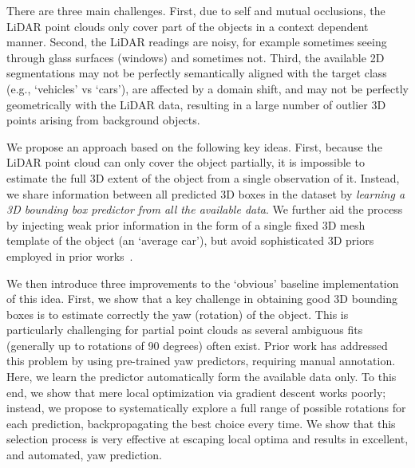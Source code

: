 
There are three main challenges.
First, due to self and mutual occlusions, the LiDAR point clouds only cover part of the objects in a context dependent manner.
Second, the LiDAR readings are noisy, for example sometimes seeing through glass surfaces (windows) and sometimes not.
Third, the available 2D segmentations may not be perfectly semantically aligned with the target class (e.g., `vehicles' vs `cars'), are affected by a domain shift, and may not be perfectly geometrically with the LiDAR data, resulting in a large number of outlier 3D points arising from background objects.

We propose an approach based on the following key ideas.
First, because the LiDAR point cloud can only cover the object partially, it is impossible to estimate the full 3D extent of the object from a single observation of it.
Instead, we share information between all predicted 3D boxes in the dataset by \emph{learning a 3D bounding box predictor from all the available data}.
We further aid the process by injecting weak prior information in the form of a single fixed 3D mesh template of the object (an `average car'), but avoid sophisticated 3D priors employed in prior works~\cite{sdflabel,qin20weakly}.

We then introduce three improvements to the `obvious' baseline implementation of this idea.
First, we show that a key challenge in obtaining good 3D bounding boxes is to estimate correctly the yaw (rotation) of the object.
This is particularly challenging for partial point clouds as several ambiguous fits (generally up to rotations of 90 degrees) often exist.
Prior work has addressed this problem by using pre-trained yaw predictors, requiring manual annotation.
Here, we learn the predictor automatically form the available data only.
To this end, we show that mere local optimization via gradient descent works poorly;
instead, we propose to systematically explore a full range of possible rotations for each prediction, backpropagating the best choice every time.
We show that this selection process is very effective at escaping local optima and results in excellent, and automated, yaw prediction.

